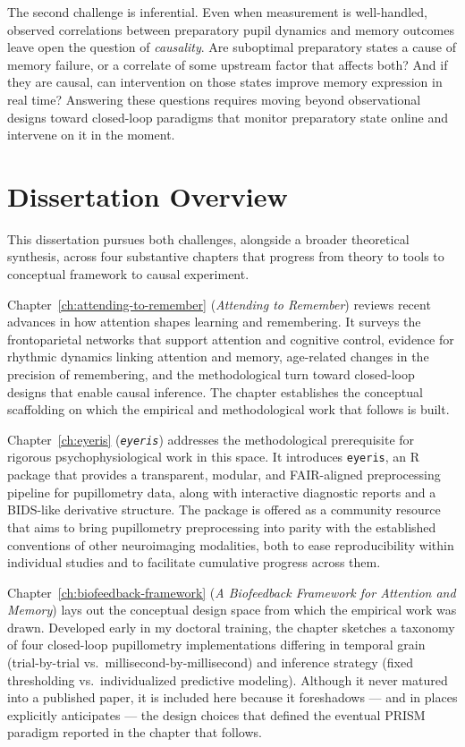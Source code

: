 The second challenge is inferential. Even when measurement is well-handled, observed correlations between preparatory pupil dynamics and memory outcomes leave open the question of \textit{causality}. Are suboptimal preparatory states a cause of memory failure, or a correlate of some upstream factor that affects both? And if they are causal, can intervention on those states improve memory expression in real time? Answering these questions requires moving beyond observational designs toward closed-loop paradigms that monitor preparatory state online and intervene on it in the moment.

\section{Dissertation Overview}

This dissertation pursues both challenges, alongside a broader theoretical synthesis, across four substantive chapters that progress from theory to tools to conceptual framework to causal experiment.

Chapter~\ref{ch:attending-to-remember} (\textit{Attending to Remember}) reviews recent advances in how attention shapes learning and remembering. It surveys the frontoparietal networks that support attention and cognitive control, evidence for rhythmic dynamics linking attention and memory, age-related changes in the precision of remembering, and the methodological turn toward closed-loop designs that enable causal inference. The chapter establishes the conceptual scaffolding on which the empirical and methodological work that follows is built.

Chapter~\ref{ch:eyeris} (\textit{\texttt{eyeris}}) addresses the methodological prerequisite for rigorous psychophysiological work in this space. It introduces \texttt{eyeris}, an R package that provides a transparent, modular, and FAIR-aligned preprocessing pipeline for pupillometry data, along with interactive diagnostic reports and a BIDS-like derivative structure. The package is offered as a community resource that aims to bring pupillometry preprocessing into parity with the established conventions of other neuroimaging modalities, both to ease reproducibility within individual studies and to facilitate cumulative progress across them.

Chapter~\ref{ch:biofeedback-framework} (\textit{A Biofeedback Framework for Attention and Memory}) lays out the conceptual design space from which the empirical work was drawn. Developed early in my doctoral training, the chapter sketches a taxonomy of four closed-loop pupillometry implementations differing in temporal grain (trial-by-trial vs.\ millisecond-by-millisecond) and inference strategy (fixed thresholding vs.\ individualized predictive modeling). Although it never matured into a published paper, it is included here because it foreshadows --- and in places explicitly anticipates --- the design choices that defined the eventual PRISM paradigm reported in the chapter that follows.

